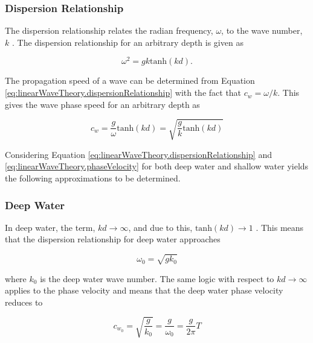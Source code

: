 \subsubsection{Dispersion Relationship} \label{subsec:theory.waves.dynamics.dispersionRelationship}

The dispersion relationship relates the radian frequency, $\omega$, to the wave number, $k$ \cite{Holthuijsen2007}. The dispersion relationship for an arbitrary depth is given as 

\begin{equation} \label{eq:linearWaveTheory.dispersionRelationship}
    \omega ^2 = gk\text{tanh}(kd).
\end{equation}

The propagation speed of a wave can be determined from Equation \ref{eq:linearWaveTheory.dispersionRelationship} with the fact that $c_{w} = \omega / k$. This gives the wave phase speed for an arbitrary depth as

\begin{equation} \label{eq:linearWaveTheory.phaseVelocity}
    c_{w} = \frac{g}{\omega}\text{tanh}(kd) = \sqrt{\frac{g}{k}\text{tanh}(kd)}
\end{equation}

Considering Equation \ref{eq:linearWaveTheory.dispersionRelationship} and \ref{eq:linearWaveTheory.phaseVelocity} for both deep water and shallow water yields the following approximations to be determined.

\subsubsection{Deep Water} \label{subsec:theory.waves.linearWaveTheory.deepWater}

In deep water, the term, $kd \to \infty$, and due to this, $\text{tanh}(kd) \to 1$ \cite{Holthuijsen2007}. This means that the dispersion relationship for deep water approaches

\begin{equation} \label{eq:linearWaveTheory.dispersionRelationship.deepWater}
    \omega_{0} = \sqrt{gk_{0}}
\end{equation}

where $k_0$ is the deep water wave number. The same logic with respect to $kd \to \infty$ applies to the phase velocity and means that the deep water phase velocity reduces to 

\begin{equation} \label{eq:linearWaveTheory.phaseVelocity.deepWater}
    c_{w_0} = \sqrt{\frac{g}{k_{0}}} = \frac{g}{\omega_{0}}  = \frac{g}{2\pi}T
\end{equation}

